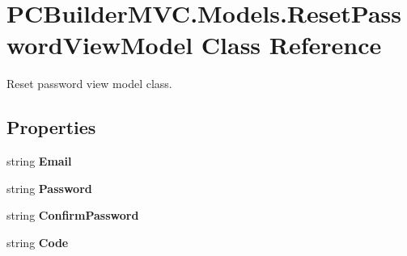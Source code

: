 \hypertarget{class_p_c_builder_m_v_c_1_1_models_1_1_reset_password_view_model}{}\section{P\+C\+Builder\+M\+V\+C.\+Models.\+Reset\+Password\+View\+Model Class Reference}
\label{class_p_c_builder_m_v_c_1_1_models_1_1_reset_password_view_model}


Reset password view model class.  


\subsection*{Properties}
\begin{DoxyCompactItemize}
\item 
string {\bfseries Email}\hypertarget{class_p_c_builder_m_v_c_1_1_models_1_1_reset_password_view_model_a2c53540b3481e1994ee9ad64750a806e}{}\label{class_p_c_builder_m_v_c_1_1_models_1_1_reset_password_view_model_a2c53540b3481e1994ee9ad64750a806e}

\item 
string {\bfseries Password}\hypertarget{class_p_c_builder_m_v_c_1_1_models_1_1_reset_password_view_model_a4d34cb18a2718e42fc07d4ee2f8135a0}{}\label{class_p_c_builder_m_v_c_1_1_models_1_1_reset_password_view_model_a4d34cb18a2718e42fc07d4ee2f8135a0}

\item 
string {\bfseries Confirm\+Password}\hypertarget{class_p_c_builder_m_v_c_1_1_models_1_1_reset_password_view_model_a0630c820b7c3f9b1e38a9740c2afb7b7}{}\label{class_p_c_builder_m_v_c_1_1_models_1_1_reset_password_view_model_a0630c820b7c3f9b1e38a9740c2afb7b7}

\item 
string {\bfseries Code}\hypertarget{class_p_c_builder_m_v_c_1_1_models_1_1_reset_password_view_model_a909fa9be9e4d1f30a709ffed921f5239}{}\label{class_p_c_builder_m_v_c_1_1_models_1_1_reset_password_view_model_a909fa9be9e4d1f30a709ffed921f5239}

\end{DoxyCompactItemize}


